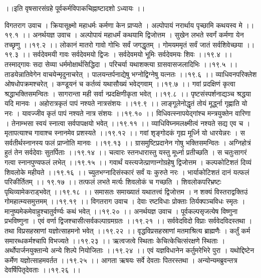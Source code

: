 \documentclass[11pt]{book}
\begin{document}
\begin{landscape}
 ।।इति वृषसारसंग्रहे पूर्वकर्मविपाकचिह्नाष्टादशो ऽध्यायः ।।




विगतराग उवाच ।
क्रियासूक्ष्मो महाधर्मः कर्मणा केन प्राप्यते ।
अल्पोपायं नरार्थाय पृच्छामि कथयस्व मे ।।१९.१ ।।
अनर्थयज्ञ उवाच ।
अल्पोपायं महाधर्मं कथयामि द्विजोत्तम ।
सुखेन लभते स्वर्गं कर्मणा येन तच्छृणु ।।१९.२ ।।
लोकानं मातरो गावो गोभिः सर्वं जगद्धृतम् ।
गोमयममृतं सर्वं जातं सर्वशिवेच्छया ।।१९.३ ।।
सर्वदेवमयी गावः सर्वदेवमयो द्विजः ।
सर्वदेवमयो भूमिः सर्वदेवमयः शिवः ।।१९.४ ।।
तस्माद्गावः सदा सेव्या धर्ममोक्षार्थसिद्धिदा ।
परिचर्या यथाशक्त्या ग्रासवासजलादिभिः ।।१९.५ ।।
ताडयेन्नातिवेगेन वाचयेन्मृदुनाचरेत् ।
पालयन्तर्पनाद्येषु भग्नोद्विग्नेषु यत्नतः ।।१९.६ ।।
व्याधिवनपरिक्लेश ओषधोपक्रमश्चरेत् ।
कण्डूयनं च कर्तव्यं यथासौख्यं भवेद्गवाम् ।।१९.७ ।।
गवां प्रदक्षिणं कृत्वा श्रद्धाभक्तिसमन्वितः ।
सागरान्ता मही सर्वा न्प्रदक्षिणीकृता भवेत् ।।१९.८ ।।
पृष्टसंस्पर्शनाद्यञ्च श्रद्धया यदि मानवः ।
अहोरात्रकृतं पापं नश्यते नात्रसंशयः ।।१९.९ ।।
लाङ्गूलेनोद्धृतं तोयं मूर्द्ध्ना गृह्णाति यो नरः ।
यावज्जीव कृतं पापं नश्यते नात्र संशयः ।।१९.१० ।।
विधिवत्स्नापयेद्गांश्च मन्त्रयुक्तेन वारिणा ।
तेनाम्भसा स्वयं स्नात्वा सर्वपापक्षयो भवेत् ।।१९.११ ।।
व्याधिविघ्नमलक्ष्मीत्वं नश्यते सद्य एव च ।
मृतापत्याश्च गावाश्च स्नानमेव प्रशस्यते ।।१९.१२ ।।
गवां शृङ्गोदकं गृह्य मूर्ध्नि यो धारयेन्नरः ।
स सर्वतीर्थस्नानस्य फलं प्राप्नोति मानवः ।।१९.१३ ।।
ग्रासमुष्टिप्रदानेन गोषु भक्तिसमन्वितः ।
अग्निहोत्रं हुतं तेन सर्वदेवाः सुतर्पिताः ।।१९.१४ ।।
चत्वारः स्तनधारास्तु यस्तु मूर्ध्ना प्रतीच्छति ।
स चतुःसागरं गत्वा स्नानपुण्यफलं लभेत् ।।१९.१५ ।।
गवार्थं यस्त्यजेत्प्राणान्गोग्रहेषु द्विजोत्तम ।
कल्पकोटिशतं दिव्यं शिवलोके महीयते ।।१९.१६ ।।
च्युतभग्नादिसंस्कारं सर्वं यः कुरुते नरः ।
भार्याकोटिशतं दानं यत्फलं परिकीर्तितम् ।। १९.१७ ।।
तत्फलं लभते मर्त्यः शिवलोकं च गच्छति ।
शिवलोकपरिभ्रष्टः पृथिव्यामेकराड्भवेत् ।।१९.१८ ।।
समासतः समाख्यातं यथातत्त्वं द्विजोत्तम ।
न शक्यं विस्तराद्वक्तिउं गोमहात्म्यसमुत्तमम् ।।१९.१९ ।।
विगतराग उवाच ।
देवाः रष्टविधाः प्रोक्ताः तिर्यक्पञ्चविधः स्मृतः ।
मानुष्यमेकमेवाहुश्चातुर्वर्ण्यः कथं भवेत् ।।१९.२० ।।
अनर्थयज्ञ उवाच ।
पूर्वकल्पसृजत्येष विष्णुना प्रभविष्णुना ।
एवं वर्णा द्विजश्चासीत्सर्वकल्पाग्रमग्रतः ।।१९.२१ ।।
सर्ववेदविदो विप्राः सर्ववेदविदस्तथा ।
तथा विप्रसहस्राणां यज्ञोत्साहमनो भवेत् ।।१९.२२ ।।
वृद्धविप्रसहस्राणां मतमाश्रित्य ब्राह्मणैः ।
कर्तुं कर्म समारब्धकर्मश्चापि विभज्यते ।।१९.२३ ।।
ऋत्वजत्वे स्थिताः केचित्केचित्संरक्षणे स्थिताः ।
अर्थोपार्जनयुक्तान्ये अन्ये शिल्पे नियोजिताः ।।१९.२४ ।।
एवं यज्ञविधानेन कर्तुमरेभिरे पुरा ।
यथोद्दिष्टेन कर्मेण यज्ञोत्साहमवर्तत ।।१९.२५ ।।
आगता ऋषयः सर्वे देवताः पितरस्तथा ।
अन्योन्यमब्रुवन्तत्र देवर्षिपितृदेवताः ।।१९.२६ ।।

\end{landscape}
\end{document}
